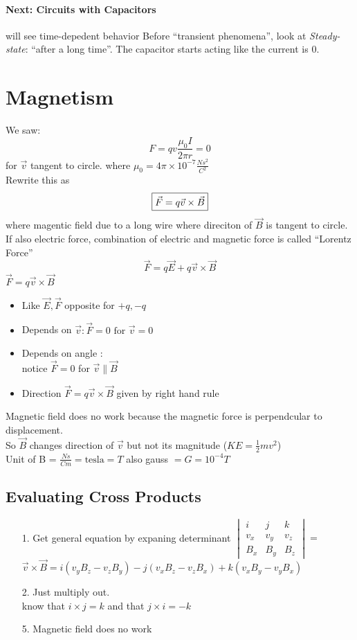 \documentclass{article}
\begin{document}
    \paragraph{Next: Circuits with Capacitors} will see time-depedent behavior
    Before ``transient phenomena'', look at \textit{Steady-state}: ``after a long time''. The capacitor starts acting like the current is 0.

    \section{Magnetism}
    We saw: $$F = qv\frac{\mu_0 I}{2\pi r} = 0$$
    for $\vec{v}$ tangent to circle.
    where $\mu_0 = 4\pi \times 10^{-7} \frac{Ns^2}{C^2}$\\
    Rewrite this as $$\boxed{$$\vec{F} = q\vec{v}\times \vec{B}$$}$$
    where  magentic field due to a long wire where direciton of $\vec{B}$ is tangent to circle.
    \\If also electric force, combination of electric and magnetic force is called ``Lorentz Force'' $$\vec{F} = q\vec{E} + q\vec{v}\times \vec{B}$$
    $\vec{F} = q\vec{v}\times \vec{B}$
    \begin{itemize}
        \item Like $\vec{E}, \vec{F}$ opposite for $+q, -q$
        \item Depends on $\vec{v}: \vec{F} = 0 \text{ for } \vec{v} = 0$
        \item Depends on angle : \\
        notice $\vec{F} = 0$ for $\vec{v} \parallel \vec{B}$
        \item Direction $\vec{F} = q\vec{v}\times\vec{B}$ given by right hand rule
    \end{itemize}
    Magnetic field does no work because the magnetic force is perpendcular to displacement.\\
    So $\vec{B}$ changes direction of $\vec{v}$ but not its magnitude ($KE = \frac{1}{2}mv^2$)\\
    Unit of B = $\frac{Ns}{Cm} = \text{tesla} = T$ also gauss $= G = 10^{-4} T$
    \subsection{Evaluating Cross Products}
    \begin{itemize}
        \item [1.] Get general equation by expaning determinant 
        $\begin{vmatrix} i & j & k \\ v_x & v_y & v_z \\ B_x & B_y & B_z\end{vmatrix} = $\\
            $\vec{v}\times \vec{B} = i(v_yB_z-v_zB_y) - j(v_xB_z - v_zB_x) + k(v_xB_y-v_yB_x)$
        \item [2.] Just multiply out.\\
        know that $i \times j = k$ and that $j \times i = -k$
        \item [5.] Magnetic field does no work
    \end{itemize}
\end{document}

